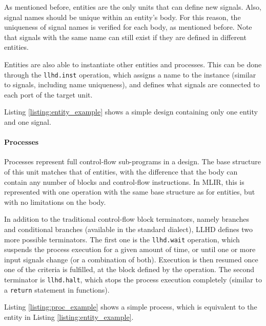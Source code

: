 As mentioned before, entities are the only units that can define new signals. Also, signal names should be unique within an entity's body. For this reason, the uniqueness of signal names is verified for each body, as mentioned before. Note that signals with the same name can still exist if they are defined in different entities.

Entities are also able to instantiate other entities and processes. This can be done through the \texttt{llhd.inst} operation, which assigns a name to the instance (similar to signals, including name uniqueness), and defines what signals are connected to each port of the target unit.

Listing \ref{listing:entity_example} shows a simple design containing only one entity and one signal.


\paragraph{Processes}
Processes represent full control-flow sub-programs in a design. The base structure of this unit matches that of entities, with the difference that the body can contain any number of blocks and control-flow instructions.
In MLIR, this is represented with one operation with the same base structure as for entities, but with no limitations on the body.

In addition to the traditional control-flow block terminators, namely branches and conditional branches (available in the standard dialect), LLHD defines two more possible terminators. The first one is the \texttt{llhd.wait} operation, which suspends the process execution for a given amount of time, or until one or more input signals change (or a combination of both). Execution is then resumed once one of the criteria is fulfilled, at the block defined by the operation. The second terminator is \texttt{llhd.halt}, which stops the process execution completely (similar to a \texttt{return} statement in functions).

Listing \ref{listing:proc_example} shows a simple process, which is equivalent to the entity in Listing \ref{listing:entity_example}.


